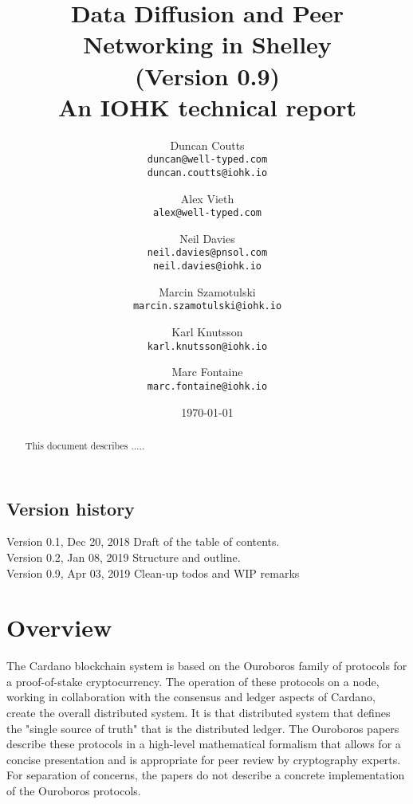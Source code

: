 \documentclass{report}
\theoremstyle{definition}{
  \newtheorem{lemma}{Lemma}[section] %
  \newtheorem{definition}[lemma]{Definition}
}
\theoremstyle{theorem}{
  \newtheorem{invariant}[lemma]{Invariant}
  \newtheorem{proofobligation}[lemma]{Proof Obligation}
}
\numberwithin{equation}{lemma}
\begin{document}
\title{Data Diffusion and Peer Networking in Shelley\\
       {\small (Version 0.9)} \\
       {\large \sc An IOHK technical report}}
\author{Duncan Coutts \\ {\small \texttt{duncan@well-typed.com}} \\
                         {\small \texttt{duncan.coutts@iohk.io}}
   \and Alex Vieth \\ {\small \texttt{alex@well-typed.com}}
   \and Neil Davies \\ {\small \texttt{neil.davies@pnsol.com}} \\
                       {\small \texttt{neil.davies@iohk.io}}
   \and Marcin Szamotulski \\ {\small \texttt{marcin.szamotulski@iohk.io}}
   \and Karl Knutsson \\ {\small \texttt{karl.knutsson@iohk.io}}
   \and Marc Fontaine \\ {\small \texttt{marc.fontaine@iohk.io}}
   }
\date{\today}

\maketitle

\begin{abstract}
  This document describes .....
\end{abstract}

\tableofcontents

\section*{Version history}

\begin{description}
\item[Version 0.1, Dec 20, 2018 Draft of the table of contents.]
\item[Version 0.2, Jan 08, 2019 Structure and outline.]
\item[Version 0.9, Apr 03, 2019 Clean-up todos and WIP remarks]
\end{description}

\chapter{Overview}
The Cardano blockchain system is based on the Ouroboros family of protocols
for a proof-of-stake cryptocurrency.
The operation of these protocols on a node, working in collaboration with the consensus
and ledger aspects of Cardano, create the overall distributed system.
It is that distributed system that defines the "single source of truth" that is the distributed ledger.
The Ouroboros papers describe these protocols in a high-level mathematical formalism
that allows for a concise presentation and is appropriate for peer review by cryptography experts.
For separation of concerns, the papers do not describe a concrete implementation of the Ouroboros
protocols.
\end{document}
